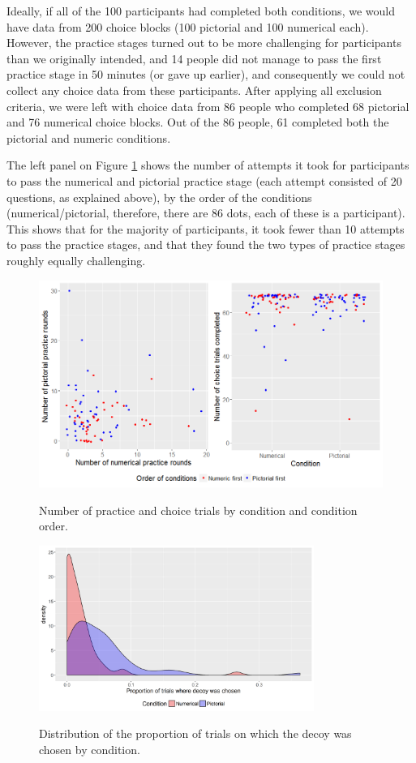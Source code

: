 \documentclass[11pt,a4paper]{article}
\begin{document}
Ideally, if all of the 100 participants had completed both conditions, we would have data from 200 choice blocks (100 pictorial and 100 numerical each). However, the practice stages turned out to be more challenging for participants than we originally intended, and 14 people did not manage to pass the first practice stage in 50 minutes (or gave up earlier), and consequently we could not collect any choice data from these participants. After applying all exclusion criteria, we were left with choice data from 86 people who completed 68 pictorial and 76 numerical choice blocks. Out of the 86 people, 61 completed both the pictorial and numeric conditions.

The left panel on Figure \ref{fig:Explor_teapot} shows the number of attempts it took for participants to pass the numerical and pictorial practice stage (each attempt consisted of 20 questions, as explained above), by the order of the conditions (numerical/pictorial, therefore, there are 86 dots, each of these is a participant). This shows that for the majority of participants, it took fewer than 10 attempts to pass the practice stages, and that they found the two types of practice stages roughly equally challenging. 


\begin{figure}
\centering
\caption{Number of practice and choice trials by condition and condition order.}
\includegraphics[width=1\textwidth]{Explor_teapot.png}
\label{fig:Explor_teapot}
\end{figure}


\begin{figure}
\centering
\caption{Distribution of the proportion of trials on which the decoy was chosen by condition.}
\includegraphics[width=0.8\textwidth]{Explor_teapot_dec.png}
\label{fig:Explor_teapot_dec}
\end{figure}
\end{document}
